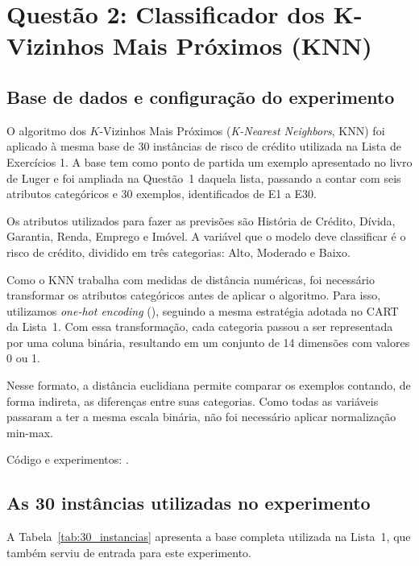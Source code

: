 \documentclass[12pt, a4paper]{article}
\DeclareRobustCommand{\texttt}[1]{\breakabletexttt{#1}}
\begin{document}
\newpage

\section{Questão 2: Classificador dos K-Vizinhos Mais Próximos (KNN)}
\label{sec:q2}

\subsection{Base de dados e configuração do experimento}

O algoritmo dos $K$-Vizinhos Mais Próximos (\textit{K-Nearest Neighbors}, KNN) foi aplicado à mesma base de 30 instâncias de risco de crédito utilizada na Lista de Exercícios 1. A base tem como ponto de partida um exemplo apresentado no livro de Luger e foi ampliada na Questão~1 daquela lista, passando a contar com seis atributos categóricos e 30 exemplos, identificados de E1 a E30.

Os atributos utilizados para fazer as previsões são História de Crédito, Dívida, Garantia, Renda, Emprego e Imóvel. A variável que o modelo deve classificar é o risco de crédito, dividido em três categorias: Alto, Moderado e Baixo.

Como o KNN trabalha com medidas de distância numéricas, foi necessário transformar os atributos categóricos antes de aplicar o algoritmo. Para isso, utilizamos \textit{one-hot encoding} (\texttt{get\_dummies}), seguindo a mesma estratégia adotada no CART da Lista~1. Com essa transformação, cada categoria passou a ser representada por uma coluna binária, resultando em um conjunto de 14 dimensões com valores 0 ou 1.

Nesse formato, a distância euclidiana permite comparar os exemplos contando, de forma indireta, as diferenças entre suas categorias. Como todas as variáveis passaram a ter a mesma escala binária, não foi necessário aplicar normalização min-max.

Código e experimentos: \texttt{src/q02\_knn/q02\_knn.ipynb}.

\subsection{As 30 instâncias utilizadas no experimento}

A Tabela~\ref{tab:30_instancias} apresenta a base completa utilizada na Lista~1, que também serviu de entrada para este experimento.
\end{document}
